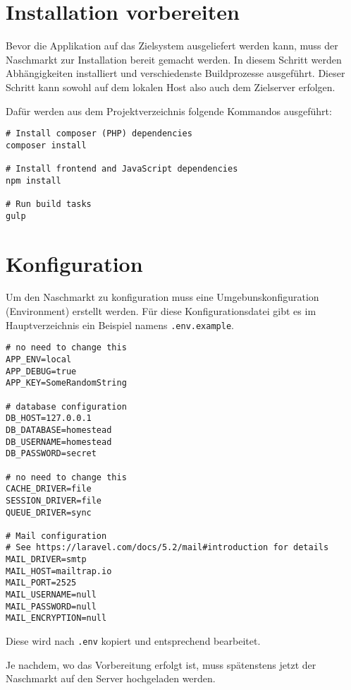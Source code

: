 \section{Installation vorbereiten}
Bevor die Applikation auf das Zielsystem ausgeliefert werden kann, muss der Naschmarkt zur Installation bereit gemacht werden.
In diesem Schritt werden Abh\"angigkeiten installiert und verschiedenste Buildprozesse ausgef\"uhrt.
Dieser Schritt kann sowohl auf dem lokalen Host also auch dem Zielserver erfolgen.

Daf\"ur werden aus dem Projektverzeichnis folgende Kommandos ausgef\"uhrt:
\begin{lstlisting}[caption=Installationsvorbereitung]
# Install composer (PHP) dependencies
composer install

# Install frontend and JavaScript dependencies
npm install

# Run build tasks
gulp
\end{lstlisting}

\section{Konfiguration}
Um den Naschmarkt zu konfiguration muss eine Umgebunskonfiguration (Environment) erstellt werden.
F\"ur diese Konfigurationsdatei gibt es im Hauptverzeichnis ein Beispiel namens \texttt{.env.example}.

\begin{lstlisting}[caption=Installationsvorbereitung]
# no need to change this
APP_ENV=local
APP_DEBUG=true
APP_KEY=SomeRandomString

# database configuration
DB_HOST=127.0.0.1
DB_DATABASE=homestead
DB_USERNAME=homestead
DB_PASSWORD=secret

# no need to change this
CACHE_DRIVER=file
SESSION_DRIVER=file
QUEUE_DRIVER=sync

# Mail configuration
# See https://laravel.com/docs/5.2/mail#introduction for details
MAIL_DRIVER=smtp
MAIL_HOST=mailtrap.io
MAIL_PORT=2525
MAIL_USERNAME=null
MAIL_PASSWORD=null
MAIL_ENCRYPTION=null
\end{lstlisting}


Diese wird nach \texttt{.env} kopiert und entsprechend bearbeitet.

Je nachdem, wo das Vorbereitung erfolgt ist, muss sp\"atenstens jetzt der Naschmarkt auf den Server hochgeladen werden.
